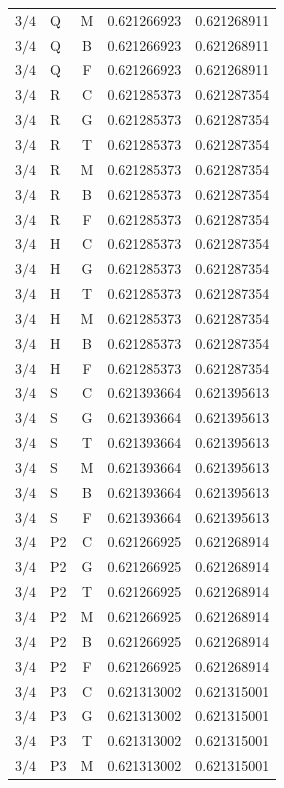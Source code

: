\begin{longtable}{clcrr}
$3/4$ & Q & M & 0.621266923 & 0.621268911 \\
$3/4$ & Q & B & 0.621266923 & 0.621268911 \\
$3/4$ & Q & F & 0.621266923 & 0.621268911 \\
$3/4$ & R & C & 0.621285373 & 0.621287354 \\
$3/4$ & R & G & 0.621285373 & 0.621287354 \\
$3/4$ & R & T & 0.621285373 & 0.621287354 \\
$3/4$ & R & M & 0.621285373 & 0.621287354 \\
$3/4$ & R & B & 0.621285373 & 0.621287354 \\
$3/4$ & R & F & 0.621285373 & 0.621287354 \\
$3/4$ & H & C & 0.621285373 & 0.621287354 \\
$3/4$ & H & G & 0.621285373 & 0.621287354 \\
$3/4$ & H & T & 0.621285373 & 0.621287354 \\
$3/4$ & H & M & 0.621285373 & 0.621287354 \\
$3/4$ & H & B & 0.621285373 & 0.621287354 \\
$3/4$ & H & F & 0.621285373 & 0.621287354 \\
$3/4$ & S & C & 0.621393664 & 0.621395613 \\
$3/4$ & S & G & 0.621393664 & 0.621395613 \\
$3/4$ & S & T & 0.621393664 & 0.621395613 \\
$3/4$ & S & M & 0.621393664 & 0.621395613 \\
$3/4$ & S & B & 0.621393664 & 0.621395613 \\
$3/4$ & S & F & 0.621393664 & 0.621395613 \\
$3/4$ & P2 & C & 0.621266925 & 0.621268914 \\
$3/4$ & P2 & G & 0.621266925 & 0.621268914 \\
$3/4$ & P2 & T & 0.621266925 & 0.621268914 \\
$3/4$ & P2 & M & 0.621266925 & 0.621268914 \\
$3/4$ & P2 & B & 0.621266925 & 0.621268914 \\
$3/4$ & P2 & F & 0.621266925 & 0.621268914 \\
$3/4$ & P3 & C & 0.621313002 & 0.621315001 \\
$3/4$ & P3 & G & 0.621313002 & 0.621315001 \\
$3/4$ & P3 & T & 0.621313002 & 0.621315001 \\
$3/4$ & P3 & M & 0.621313002 & 0.621315001 \\

\end{longtable}
